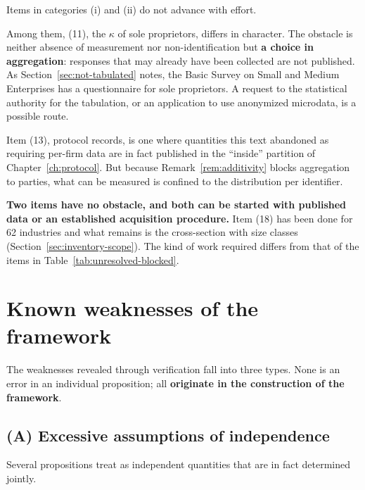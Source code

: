 Items in categories (i) and (ii) do not advance with effort.

Among them, (11), the $\kappa$ of sole proprietors, differs in character. The obstacle is
neither absence of measurement nor non-identification but \textbf{a choice in aggregation}:
responses that may already have been collected are not published. As
Section~\ref{sec:not-tabulated} notes, the Basic Survey on Small and Medium Enterprises has a
questionnaire for sole proprietors. A request to the statistical authority for the
tabulation, or an application to use anonymized microdata, is a possible route.

Item (13), protocol records, is one where quantities this text abandoned as requiring
per-firm data are in fact published in the ``inside'' partition of
Chapter~\ref{ch:protocol}. But because Remark~\ref{rem:additivity} blocks aggregation to
parties, what can be measured is confined to the distribution per identifier.

\textbf{Two items have no obstacle, and both can be started with published data or an
established acquisition procedure.} Item (18) has been done for 62 industries and what remains
is the cross-section with size classes (Section~\ref{sec:inventory-scope}). The kind of work
required differs from that of the items in Table~\ref{tab:unresolved-blocked}.

\section{Known weaknesses of the framework}

The weaknesses revealed through verification fall into three types. None is an error in an
individual proposition; all \textbf{originate in the construction of the framework}.

\subsection{(A) Excessive assumptions of independence}
\label{sec:independence-assumption}

Several propositions treat as independent quantities that are in fact determined jointly.

